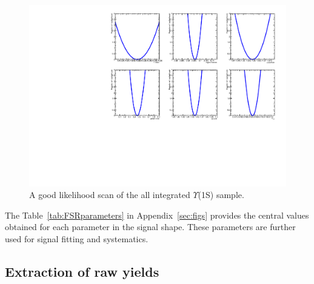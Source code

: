 \begin{figure}[h]
\begin{center}
\includegraphics[width=1\textwidth]{Chapters/aYield/likelihoodScanExampleMinBias.pdf}  
\caption{A good likelihood scan of the all integrated $\Upsilon$(1S)
  sample.}
\label{fig:likelihoodScanExampleMinBias}
\end{center}
\end{figure}


The Table~\ref{tab:FSRparameters} in Appendix~\ref{sec:figs} provides the central
values obtained for each parameter in the signal shape. These
parameters are further used for signal fitting and systematics.

\subsection{Extraction of raw \texorpdfstring{\PgU}{Y} yields}
\label{sec:sigext_yield}

